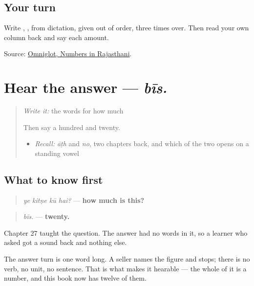 \subsection*{Your turn}
Write \textbf{}, \textbf{}, \textbf{} from dictation, given out of order, three times over. Then read your own column back and say each amount.

\begin{tcolorbox}[breakable,colback=teal!4,colframe=teal!35!black,title={Before you move on}]
Source: \href{https://www.omniglot.com/language/numbers/rajasthani.htm}{Omniglot, Numbers in Rajasthani}.
\end{tcolorbox}
\section[ye kitṇe kū hai? — bīs.]{Hear the answer — \emph{bīs.}}

\label{lesson:MW-C34-hear-price-number}



\begin{quote}
\emph{Write it:} the words for how much

Then say a hundred and twenty.

\begin{itemize}
\raggedright
  \item \emph{Recall:} \emph{āṭh} and \emph{no}, two chapters back, and which of the two opens on a standing vowel
\end{itemize}
\end{quote}

\subsection*{What to know first}
\begin{quote}
\emph{ye kitṇe kū hai?} — \textbf{how much is this?}
\end{quote}

\begin{quote}
\emph{bīs.} — \textbf{twenty.}
\end{quote}

Chapter 27 taught the question. The answer had no words in it, so a learner who asked got a sound back and nothing else.

The answer turn is one word long. A seller names the figure and stops; there is no verb, no unit, no sentence. That is what makes it hearable — the whole of it is a number, and this book now has twelve of them.

